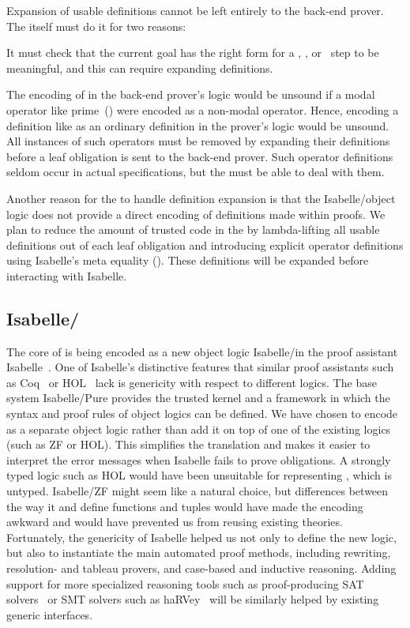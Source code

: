 \documentclass[a4paper]{easychair}
\begin{document}
Expansion of usable definitions cannot be left entirely to the
back-end prover.  The \PM itself must do it for two reasons:
\begin{icom}
\item It must check that the current goal has the right form for a
  \TAKE, \WITNESS, or \HAVE\ step to be meaningful, and this can require
  expanding definitions.

\item The encoding of \tlaplus in the back-end prover's logic would be
  unsound if a modal operator like prime~() were encoded as a
  non-modal operator. Hence, encoding a definition like 
  as an ordinary definition in the prover's logic would be unsound.
  All instances of such operators must be removed by expanding their
  definitions before a leaf obligation is sent to the back-end prover.
Such operator definitions seldom occur in actual \tlaplus
  specifications, but the \PM must be able to deal with them.
\end{icom}
Another reason for the \PM to handle definition expansion is that the
Isabelle/\tlaplus object logic does not provide a direct encoding of
definitions made within proofs. We plan to reduce the amount of
trusted code in the \PM by lambda-lifting all usable definitions out
of each leaf obligation and introducing explicit operator definitions
using Isabelle's meta equality (). These definitions will be
expanded before interacting with Isabelle.


\subsection{Isabelle/\tlaplus}
\label{sec:backend.isa}

The core of \tlatwo is being encoded as a new object logic
Isabelle/\tlaplus in the proof assistant
Isabelle~\cite{paulson:isabelle}.  One of Isabelle's distinctive
features that similar proof assistants such as Coq~\cite{coq} or
HOL~\cite{gordon:hol,harrison:hol} lack is genericity with respect to
different logics. The base system Isabelle/Pure provides the trusted
kernel and a framework in which the syntax and proof rules of object
logics can be defined. We have chosen to encode \tlatwo as a separate
object logic rather than add it on top of one of the existing logics
(such as ZF or HOL). This simplifies the translation and makes it
easier to interpret the error messages when Isabelle fails to prove
obligations. A strongly typed logic such as HOL would have been
unsuitable for representing \tlatwo, which is untyped. Isabelle/ZF
might seem like a natural choice, but differences between the way it
and \tlaplus define functions and tuples would have made the
encoding awkward and would have prevented us from reusing existing
theories. Fortunately, the genericity of Isabelle helped us not only
to define the new logic, but also to instantiate the main automated
proof methods, including rewriting, resolution- and tableau provers,
and case-based and inductive reasoning.  Adding support for more
specialized reasoning tools such as proof-producing SAT
solvers~\cite{fontaine:automation} or SMT solvers such as
haRVey~\cite{deharbe:decision} will be similarly helped by existing
generic interfaces.
\end{document}
